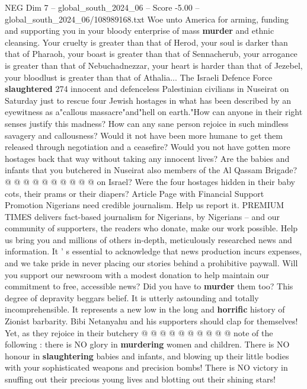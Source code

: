 \begin{textsample}{NEG Dim 7 – global\_south\_2024\_06 – Score -5.00 – global\_south\_2024\_06/108989168.txt}  \label{ex:f7_neg_366}
Woe unto America for arming, funding and supporting you in your bloody enterprise of mass \textbf{murder} and ethnic cleansing.
Your cruelty is greater than that of Herod, your soul is darker than that of Pharaoh, your boast is greater than that of Sennacherub, your arrogance is greater than that of Nebuchadnezzar, your heart is harder than that of Jezebel, your bloodlust is greater than that of Athalia...
The Israeli Defence Force \textbf{slaughtered} 274 innocent and defenceless Palestinian civilians in Nuseirat on Saturday just to rescue four Jewish hostages in what has been described by an eyewitness as a"callous massacre"and"hell on earth."How can anyone in their right senses justify this madness?
How can any sane person rejoice in such mindless savagery and callousness?
Would it not have been more humane to get them released through negotiation and a ceasefire?
Would you not have gotten more hostages back that way without taking any innocent lives?
Are the babies and infants that you butchered in Nuseirat also members of the Al Qassam Brigade? @ @ @ @ @ @ @ @ @ @ on Israel?
Were the four hostages hidden in their baby cots, their prams or their diapers?
Article Page with Financial Support Promotion Nigerians need credible journalism.
Help us report it.
PREMIUM TIMES delivers fact-based journalism for Nigerians, by Nigerians -- and our community of supporters, the readers who donate, make our work possible.
Help us bring you and millions of others in-depth, meticulously researched news and information.
It ' s essential to acknowledge that news production incurs expenses, and we take pride in never placing our stories behind a prohibitive paywall.
Will you support our newsroom with a modest donation to help maintain our commitment to free, accessible news?
Did you have to \textbf{murder} them too?
This degree of depravity beggars belief.
It is utterly astounding and totally incomprehensible.
It represents a new low in the long and \textbf{horrific} history of Zionist barbarity.
Bibi Netanyahu and his supporters should clap for themselves!
Yet, as they rejoice in their butchery @ @ @ @ @ @ @ @ @ @ note of the following : there is NO glory in \textbf{murdering} women and children.
There is NO honour in \textbf{slaughtering} babies and infants, and blowing up their little bodies with your sophisticated weapons and precision bombs!
There is NO victory in snuffing out their precious young lives and blotting out their shining stars!

\end{textsample}
